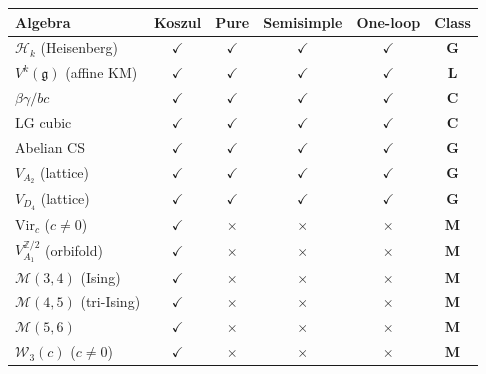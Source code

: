 \documentclass[11pt]{article}
\newcommand{\cW}{\mathcal{W}}
\newcommand{\Z}{\mathbb{Z}}
\begin{document}
\begin{center}
\renewcommand{\arraystretch}{1.3}
\begin{tabular}{@{}lccccc@{}}
\toprule
\textbf{Algebra} & \textbf{Koszul} & \textbf{Pure}
  & \textbf{Semisimple} & \textbf{One-loop}
  & \textbf{Class} \\
\midrule
$\mathcal{H}_k$ (Heisenberg) & $\checkmark$ & $\checkmark$
  & $\checkmark$ & $\checkmark$ & $\mathbf{G}$ \\
$V^k(\mathfrak{g})$ (affine KM) & $\checkmark$ & $\checkmark$
  & $\checkmark$ & $\checkmark$ & $\mathbf{L}$ \\
$\beta\gamma/bc$ & $\checkmark$ & $\checkmark$
  & $\checkmark$ & $\checkmark$ & $\mathbf{C}$ \\
LG cubic & $\checkmark$ & $\checkmark$
  & $\checkmark$ & $\checkmark$ & $\mathbf{C}$ \\
Abelian CS & $\checkmark$ & $\checkmark$
  & $\checkmark$ & $\checkmark$ & $\mathbf{G}$ \\
$V_{A_2}$ (lattice) & $\checkmark$ & $\checkmark$
  & $\checkmark$ & $\checkmark$ & $\mathbf{G}$ \\
$V_{D_4}$ (lattice) & $\checkmark$ & $\checkmark$
  & $\checkmark$ & $\checkmark$ & $\mathbf{G}$ \\
\midrule
$\mathrm{Vir}_c$ ($c \neq 0$) & $\checkmark$ & $\times$
  & $\times$ & $\times$ & $\mathbf{M}$ \\
$V_{A_1}^{\Z/2}$ (orbifold) & $\checkmark$ & $\times$
  & $\times$ & $\times$ & $\mathbf{M}$ \\
$\mathcal{M}(3,4)$ (Ising) & $\checkmark$ & $\times$
  & $\times$ & $\times$ & $\mathbf{M}$ \\
$\mathcal{M}(4,5)$ (tri-Ising) & $\checkmark$ & $\times$
  & $\times$ & $\times$ & $\mathbf{M}$ \\
$\mathcal{M}(5,6)$ & $\checkmark$ & $\times$
  & $\times$ & $\times$ & $\mathbf{M}$ \\
$\cW_3(c)$ ($c \neq 0$) & $\checkmark$ & $\times$
  & $\times$ & $\times$ & $\mathbf{M}$ \\
\bottomrule
\end{tabular}
\end{center}
\end{document}
